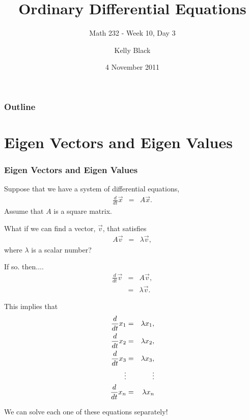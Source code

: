 
\title{Ordinary Differential Equations}
\subtitle{Math 232 - Week 10, Day 3}

\author{Kelly Black}
\date{4 November 2011}

\begin{frame}
  \titlepage
\end{frame}

\begin{frame}
  \frametitle{Outline}
\end{frame}


\section{Eigen Vectors and Eigen Values}


\begin{frame}
  \frametitle{Eigen Vectors and Eigen Values}

  Suppose that we have a system of differential equations,
  \begin{eqnarray*}
    \frac{d}{dt} \vec{x} & = & A \vec{x}.
  \end{eqnarray*}
  Assume that $A$ is a square matrix.

  What if we can find a vector, $\vec{v}$, that satisfies
  \begin{eqnarray*}
    A \vec{v} & = & \lambda \vec{v},
  \end{eqnarray*}
  where $\lambda$ is a scalar number?

\end{frame}


\begin{frame}
  If so. then....
  \begin{eqnarray*}
    \frac{d}{dt} \vec{v} & = & A \vec{v}, \\
    & = & \lambda \vec{v}.
  \end{eqnarray*}
  
  This implies that
  \begin{eqnarray*}
    \deriv{x_1}{t} & = & \lambda x_1, \\
    \deriv{x_2}{t} & = & \lambda x_2, \\
    \deriv{x_3}{t} & = & \lambda x_3, \\
    \vdots         &   & \vdots \\
    \deriv{x_n}{t} & = & \lambda x_n
  \end{eqnarray*}

  We can solve each one of these equations separately!

\end{frame}


